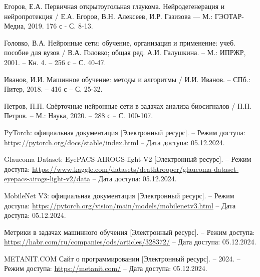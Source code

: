 {\begin{thebibliography}{99}
    Егоров, Е.А. Первичная открытоугольная глаукома. Нейродегенерация и нейропротекция / Е.А. Егоров, В.Н. Алексеев, И.Р. Газизова — М.: ГЭОТАР-Медиа, 2019. 176 с - С. 8-13.
    
    Головко, В.А. Нейронные сети: обучение, организация и применение: учеб. пособие для вузов / В.А. Головко; общая ред. А.И. Галушкина. – М.: ИПРЖР, 2001. – Кн. 4. – 256 с – С. 40-47.
    
    Иванов, И.И. Машинное обучение: методы и алгоритмы / И.И. Иванов. – СПб.: Питер, 2018. – 416 с – С. 25-32.

    Петров, П.П. Свёрточные нейронные сети в задачах анализа биосигналов / П.П. Петров. – М.: Наука, 2020. – 288 с – С. 100-107.
    
    PyTorch: официальная документация [Электронный ресурс]. – Режим доступа: \url{https://pytorch.org/docs/stable/index.html} – Дата доступа: 05.12.2024.
    
    Glaucoma Dataset: EyePACS-AIROGS-light-V2 [Электронный ресурс]. – Режим доступа: \url{https://www.kaggle.com/datasets/deathtrooper/glaucoma-dataset-eyepacs-airogs-light-v2/data} – Дата доступа: 05.12.2024.

    MobileNet V3: официальная документация [Электронный ресурс]. – Режим доступа: \url{https://pytorch.org/vision/main/models/mobilenetv3.html} – Дата доступа: 05.12.2024.
    
    Метрики в задачах машинного обучения [Электронный ресурс]. – Режим доступа: \url{https://habr.com/ru/companies/ods/articles/328372/} – Дата доступа: 05.12.2024.
    
    METANIT.COM Сайт о программировании [Электронный ресурс]. – 2024. – Режим доступа: \url{https://metanit.com/} – Дата доступа: 05.12.2024.
    \end{thebibliography}
    \clearpage
}